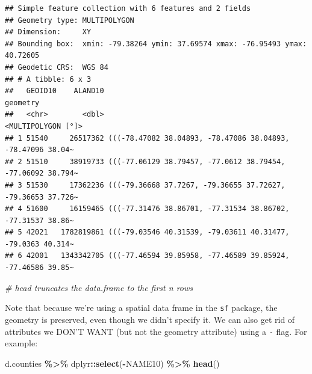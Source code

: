 \documentclass[]{article}
\newenvironment{Shaded}{\begin{snugshade}}{\end{snugshade}}
\newcommand{\CommentTok}[1]{\textcolor[rgb]{0.56,0.35,0.01}{\textit{#1}}}
\newcommand{\FunctionTok}[1]{\textcolor[rgb]{0.13,0.29,0.53}{\textbf{#1}}}
\newcommand{\NormalTok}[1]{#1}
\newcommand{\SpecialCharTok}[1]{\textcolor[rgb]{0.81,0.36,0.00}{\textbf{#1}}}
\begin{document}
\begin{verbatim}
## Simple feature collection with 6 features and 2 fields
## Geometry type: MULTIPOLYGON
## Dimension:     XY
## Bounding box:  xmin: -79.38264 ymin: 37.69574 xmax: -76.95493 ymax: 40.72605
## Geodetic CRS:  WGS 84
## # A tibble: 6 x 3
##   GEOID10    ALAND10                                                    geometry
##   <chr>        <dbl>                                          <MULTIPOLYGON [°]>
## 1 51540     26517362 (((-78.47082 38.04893, -78.47086 38.04893, -78.47096 38.04~
## 2 51510     38919733 (((-77.06129 38.79457, -77.0612 38.79454, -77.06092 38.794~
## 3 51530     17362236 (((-79.36668 37.7267, -79.36655 37.72627, -79.36653 37.726~
## 4 51600     16159465 (((-77.31476 38.86701, -77.31534 38.86702, -77.31537 38.86~
## 5 42021   1782819861 (((-79.03546 40.31539, -79.03611 40.31477, -79.0363 40.314~
## 6 42001   1343342705 (((-77.46594 39.85958, -77.46589 39.85924, -77.46586 39.85~
\end{verbatim}

\begin{Shaded}
\begin{Highlighting}[]
\CommentTok{\# head truncates the data.frame to the first n rows}
\end{Highlighting}
\end{Shaded}

Note that because we're using a spatial data frame in the \texttt{sf}
package, the geometry is preserved, even though we didn't specify it. We
can also get rid of attributes we DON'T WANT (but not the geometry
attribute) using a \texttt{-} flag. For example:

\begin{Shaded}
\begin{Highlighting}[]
\NormalTok{d.counties }\SpecialCharTok{\%\textgreater{}\%}\NormalTok{ dplyr}\SpecialCharTok{::}\FunctionTok{select}\NormalTok{(}\SpecialCharTok{{-}}\NormalTok{NAME10) }\SpecialCharTok{\%\textgreater{}\%} \FunctionTok{head}\NormalTok{()}
\end{Highlighting}
\end{Shaded}
\end{document}

